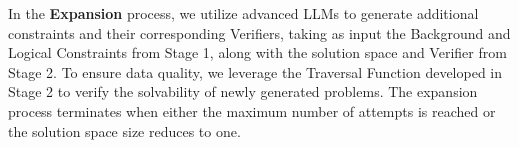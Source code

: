 In the \textbf{Expansion} process, we utilize advanced LLMs to generate additional constraints and their corresponding Verifiers, taking as input the Background and Logical Constraints from Stage 1, along with the solution space and Verifier from Stage 2. To ensure data quality, we leverage the Traversal Function developed in Stage 2 to verify the solvability of newly generated problems. The expansion process terminates when either the maximum number of attempts is reached or the solution space size reduces to one.












